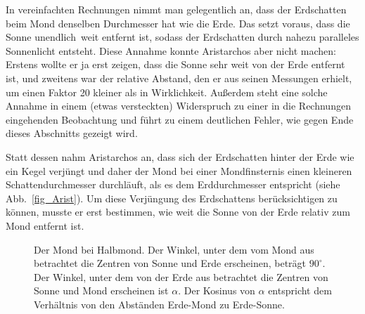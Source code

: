 In vereinfachten Rechnungen nimmt man gelegentlich an, dass der Erdschatten beim Mond denselben Durchmesser
hat wie die Erde. Das setzt voraus, dass die Sonne \glqq unendlich\grqq\ weit entfernt ist, sodass der 
Erdschatten durch nahezu paralleles Sonnenlicht entsteht. Diese Annahme konnte Aristarchos aber 
nicht machen: Erstens wollte er ja erst zeigen, dass die Sonne sehr weit von der Erde entfernt ist,
und zweitens war der relative Abstand, den er aus seinen Messungen erhielt, um einen Faktor 20
kleiner als in Wirklichkeit. Au\ss erdem steht eine solche Annahme in einem (etwas versteckten) Widerspruch 
zu einer in die Rechnungen eingehenden Beobachtung und f\"uhrt zu
einem deutlichen Fehler, wie gegen Ende dieses Abschnitts gezeigt wird. 

Statt dessen nahm Aristarchos an, dass sich der Erdschatten hinter der Erde wie ein Kegel
verj\"ungt und daher der Mond bei einer Mondfinsternis einen kleineren Schattendurchmesser 
durchl\"auft, als es dem Erddurchmesser entspricht (siehe Abb.\ \ref{fig_Arist}). Um diese 
Verj\"ungung des Erdschattens ber\"ucksichtigen 
zu k\"onnen, musste er erst bestimmen, wie weit die Sonne von der Erde relativ zum Mond entfernt ist.

\begin{figure}[htb]
\caption{\label{fig_Arist2}%
Der Mond bei Halbmond. Der Winkel, unter dem vom Mond aus betrachtet die Zentren von
Sonne und Erde erscheinen, betr\"agt $90^\circ$. Der Winkel, unter dem von der Erde
aus betrachtet die Zentren von Sonne und Mond erscheinen ist $\alpha$. Der Kosinus von $\alpha$ entspricht 
dem Verh\"altnis von den Abst\"anden Erde-Mond zu Erde-Sonne.}
\end{figure}

